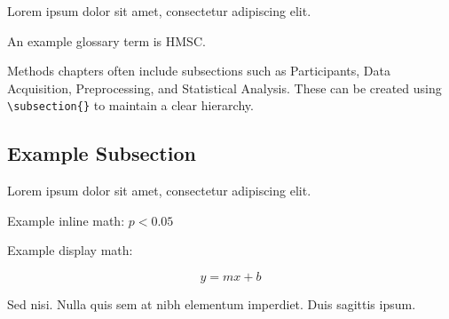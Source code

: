 Lorem ipsum dolor sit amet, consectetur adipiscing elit.\supercite{example_reference_2}

An example glossary term is \gls{HMSC}.


Methods chapters often include subsections such as Participants, Data Acquisition, Preprocessing, and Statistical Analysis. These can be created using \texttt{\textbackslash subsection\{\}} to maintain a clear hierarchy.

\subsection{Example Subsection}

Lorem ipsum dolor sit amet, consectetur adipiscing elit.

Example inline math: $p < 0.05$


Example display math:

\[
y = mx + b
\]


Sed nisi. Nulla quis sem at nibh elementum imperdiet. Duis sagittis ipsum.
